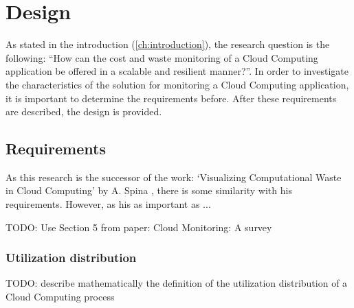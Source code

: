\chapter{Design}\label{ch:design} %
As stated in the introduction (\autoref{ch:introduction}), the research question is the following: ``How can the cost and waste monitoring of a Cloud Computing application be offered in a scalable and resilient manner?''. In order to investigate the characteristics of the solution for monitoring a Cloud Computing application, it is important to determine the requirements before. After these requirements are described, the design is provided. 

\section{Requirements} \label{sec:requirements}
As this research is the successor of the work: `Visualizing Computational Waste in Cloud Computing' by A. Spina \cite{spina}, there is some similarity with his requirements. However, as his as important as ...

TODO: Use Section 5 from paper: Cloud Monitoring: A survey


\subsection{Utilization distribution} \label{sec:utilization}
TODO: describe mathematically the definition of the utilization distribution of a Cloud Computing process 